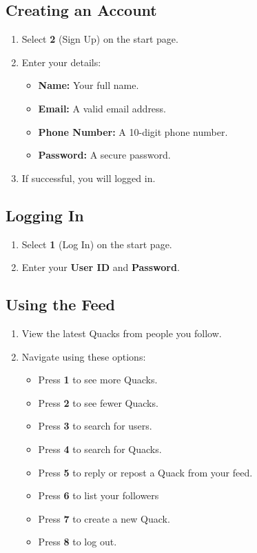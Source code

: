 \documentclass[letterpaper, 11pt]{article}
\begin{document}
\subsection*{Creating an Account}
\begin{enumerate}
    \item Select \textbf{2} (Sign Up) on the start page.
    \item Enter your details:
        \begin{itemize}
            \item \textbf{Name:} Your full name.
            \item \textbf{Email:} A valid email address.
            \item \textbf{Phone Number:} A 10-digit phone number.
            \item \textbf{Password:} A secure password.
        \end{itemize}
    \item If successful, you will logged in.
\end{enumerate}

\subsection*{Logging In}
\begin{enumerate}
    \item Select \textbf{1} (Log In) on the start page.
    \item Enter your \textbf{User ID} and \textbf{Password}.
\end{enumerate}

\subsection*{Using the Feed}
\begin{enumerate}
    \item View the latest Quacks from people you follow.
    \item Navigate using these options:
        \begin{itemize}
            \item Press \textbf{1} to see more Quacks.
            \item Press \textbf{2} to see fewer Quacks.
            \item Press \textbf{3} to search for users.
            \item Press \textbf{4} to search for Quacks.
            \item Press \textbf{5} to reply or repost a Quack from your feed.
            \item Press \textbf{6} to list your followers
            \item Press \textbf{7} to create a new Quack.
            \item Press \textbf{8} to log out.
        \end{itemize}
\end{enumerate}
\end{document}
